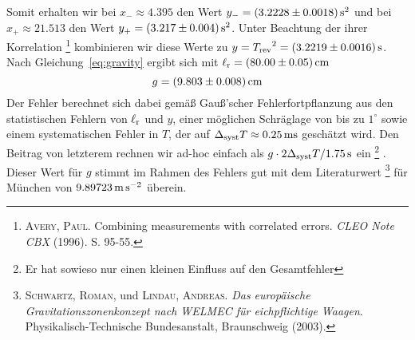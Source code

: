 Somit erhalten wir bei $x_- \approx 4.395$ den Wert $y_- = \unit[(3.2228 \pm 0.0018)]{s^2}$ und bei $x_+ \approx 21.513$ den Wert $y_+ = \unit[(3.217 \pm 0.004)]{s^2}$. Unter Beachtung der ihrer Korrelation%
\footnote{\textsc{Avery, Paul}. Combining measurements with correlated errors. \textit{CLEO Note CBX} (1996). S. 95-55.}
kombinieren wir diese Werte zu $y = {T_\mathrm{rev}}^2 = \unit[(3.2219 \pm 0.0016)]{s}$.
Nach Gleichung~\ref{eq:gravity} ergibt sich mit $\l_\mathrm{r} = \unit[(80.00 \pm 0.05)]{cm}$
\[
    g = \unit[(9.803 \pm 0.008)]{cm}
\]
Der Fehler berechnet sich dabei gemäß Gauß'scher Fehlerfortpflanzung aus den statistischen Fehlern von $\ell_\mathrm{r}$ und $y$, einer möglichen Schräglage von bis zu $1^\circ$ sowie einem systematischen Fehler in $T$, der auf $\Delta_\mathrm{syst} T \approx \unit[0.25]{ms}$ geschätzt wird. Den Beitrag von letzterem rechnen wir ad-hoc einfach als $g \cdot 2 \Delta_\mathrm{syst} T / \unit[1.75]{s}$ ein%
\footnote{Er hat sowieso nur einen kleinen Einfluss auf den Gesamtfehler}%
. Dieser Wert für $g$ stimmt im Rahmen des Fehlers gut mit dem Literaturwert%
\footnote{\textsc{Schwartz, Roman}, und \textsc{Lindau, Andreas}. \textit{Das europäische Gravitationszonenkonzept nach WELMEC für eichpflichtige Waagen}. Physikalisch-Technische Bundesanstalt, Braunschweig (2003).}
für München von $\unit[9.89723]{m\,s^{-2}}$ überein.

